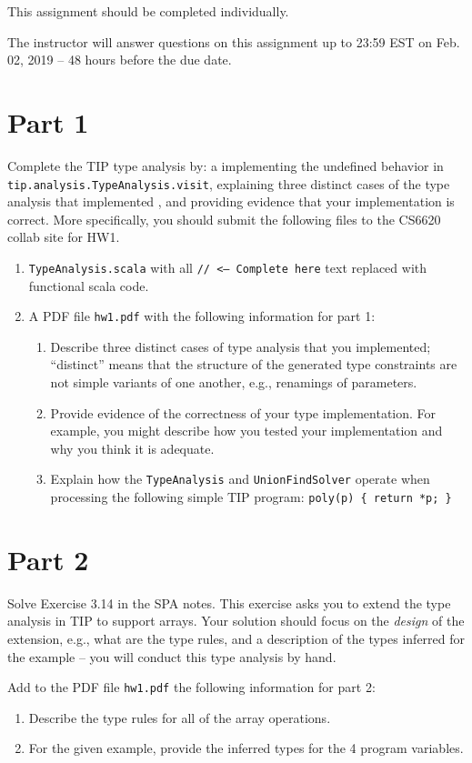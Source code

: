 \documentclass[12pt,letterpaper]{article}
\begin{document}
This assignment should be completed individually.

The instructor will answer questions on this assignment up to 23:59 EST on Feb. 02, 2019 -- 48 hours before the due date.


\section*{Part 1}
Complete the TIP type analysis by: a implementing the undefined behavior in\\
\texttt{tip.analysis.TypeAnalysis.visit}, explaining three distinct cases of the type analysis that implemented , and providing evidence that your implementation is correct.  More specifically, you should submit the following files to the CS6620 collab site for HW1.
\begin{enumerate}
\item \texttt{TypeAnalysis.scala} with all \texttt{// <--- Complete here} text replaced with functional scala code.
\item A PDF file \texttt{hw1.pdf} with the following information for part 1: 
\begin{enumerate}
\item Describe three distinct cases of type analysis that you implemented; ``distinct'' means that the structure of the generated type constraints are not simple variants of one another, e.g., renamings of parameters. 
\item Provide evidence of the correctness of your type implementation.  For example, you might describe how you tested your implementation and why you think it is adequate.
\item Explain how the \texttt{TypeAnalysis} and \texttt{UnionFindSolver} operate
when processing the following simple TIP program: \texttt{poly(p) \{ return *p; \}}
\end{enumerate}
\end{enumerate}

\section*{Part 2}
Solve Exercise 3.14 in the SPA notes.  This exercise asks you to 
extend the type analysis in TIP to support arrays.   Your solution
should focus on the \textit{design} of the extension, e.g., what 
are the type rules, and a description of the types inferred for the
example -- you will conduct this type analysis by hand.

Add to the PDF file \texttt{hw1.pdf} the following information for part 2: 
\begin{enumerate}
\item Describe the type rules for all of the array operations.
\item For the given example, provide the inferred types for the 4 program variables.
\end{enumerate}
\end{document}
